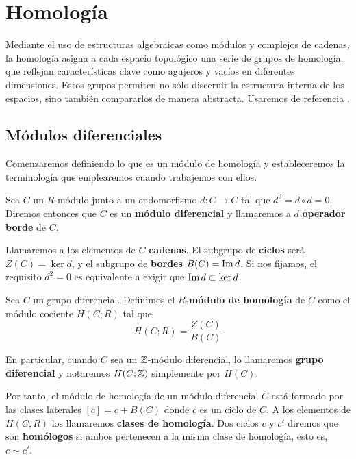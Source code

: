 
\chapter{Homología}

Mediante el uso de estructuras algebraicas como módulos y complejos de cadenas,
la homología asigna a cada espacio topológico una serie de grupos de homología, que
reflejan características clave como agujeros y vacíos en diferentes dimensiones.
Estos grupos permiten no sólo discernir la estructura interna de los espacios, sino
también compararlos de manera abstracta. Usaremos de referencia
\cite{maclane2012homology}.

\section{Módulos diferenciales}

Comenzaremos definiendo lo que es un módulo de homología y estableceremos la terminología
que emplearemos cuando trabajemos con ellos.

\begin{definicion}
	Sea \(C\) un \(R\)-módulo junto a un endomorfismo \(d: C \rightarrow C\) tal que \(d^{2}
	= d \circ d = 0\). Diremos entonces que \(C\) es un \textbf{módulo diferencial} y
	llamaremos a \(d\) \textbf{operador borde} de \(C\).
\end{definicion}

Llamaremos a los elementos de \(C\) \textbf{cadenas}. El subgrupo de \textbf{ciclos}
será \(Z(C) = \ker d\), y el subgrupo de \textbf{bordes} \(B(C) = \operatorname{Im} d\). Si nos
fijamos, el requisito \(d^{2} = 0\) es equivalente a exigir que \(\operatorname{Im}{d}\subset \ker
{d}\).

\begin{definicion}
	Sea \(C\) un grupo diferencial. Definimos el \textbf{\(R\)-módulo de homología} de
	\(C\) como el módulo cociente \(H(C;R)\) tal que
	\[
		H(C;R) = \frac{Z(C)}{B(C)}
	\]
\end{definicion}

En particular, cuando \(C\) sea un \(\mathbb{Z}\)-módulo diferencial, lo llamaremos \textbf{grupo
diferencial} y notaremos \(H(C;\mathbb{Z})\) simplemente por \(H(C)\).

Por tanto, el módulo de homología de un módulo diferencial \(C\) está formado por
las clases laterales \([c] = c + B(C)\) donde \(c\) es un ciclo de \(C\). A los elementos
de \(H(C;R)\) los llamaremos \textbf{clases de homología}. Dos ciclos \(c\) y \(c'\) diremos
que son \textbf{homólogos} si ambos pertenecen a la misma clase de homología, esto
es, \(c \sim c'\).

